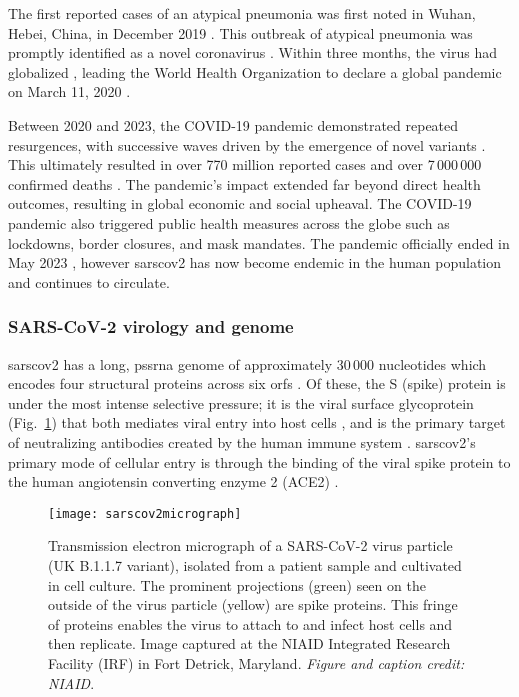 The first reported cases of an atypical pneumonia was first noted in Wuhan, Hebei, China, in December 2019 \citep{zhou2020pneumonia}.
This outbreak of atypical pneumonia was promptly identified as a novel coronavirus \citep{wu2020new}.
Within three months, the virus had globalized \citep{dong2020interactive}, leading the World Health Organization to declare a global pandemic on March 11, 2020 \citep{healthorganization2020coronavirus}.

Between 2020 and 2023, the COVID-19 pandemic demonstrated repeated resurgences, with successive waves driven by the emergence of novel variants \citep{telenti2022evolution}.
This ultimately resulted in over 770 million reported cases and over 7\,000\,000 confirmed deaths \citep{ourworldindata-covid-explorer}.
The pandemic's impact extended far beyond direct health outcomes, resulting in global economic and social upheaval.
The COVID-19 pandemic also triggered public health measures across the globe such as lockdowns, border closures, and mask mandates.
The pandemic officially ended in May 2023 \citep{unnews2023end}, however \gls{sarscov2} has now become endemic in the human population and continues to circulate.

\subsubsection{SARS-CoV-2 virology and genome}
\gls{sarscov2} has a long, \gls{pssrna} genome of approximately 30\,000 nucleotides which encodes four structural proteins across six \gls{orf}s \citep{Khailany2020}.
Of these, the S (spike) protein is under the most intense selective pressure; it is the viral surface glycoprotein (Fig.~\ref{fig:sarscov2micrograph}) that both mediates viral entry into host cells \citep{zhu2021molecular}, and is the primary target of neutralizing antibodies created by the human immune system \citep{v2021coronavirus}.
\gls{sarscov2}'s primary mode of cellular entry is through the binding of the viral spike protein to the human angiotensin converting enzyme 2 (ACE2) \citep{Andersen2020}.

\begin{figure}[ht]
  \centering
  \texttt{[image: sarscov2micrograph]}
  \caption[SARS-CoV-2 electron micrograph]{Transmission electron micrograph of a SARS-CoV-2 virus particle (UK B.1.1.7 variant), isolated from a patient sample and cultivated in cell culture. The prominent projections (green) seen on the outside of the virus particle (yellow) are spike proteins. This fringe of proteins enables the virus to attach to and infect host cells and then replicate. Image captured at the NIAID Integrated Research Facility (IRF) in Fort Detrick, Maryland.
  \textit{Figure and caption credit: NIAID}.
  }
  \label{fig:sarscov2micrograph}
\end{figure}

